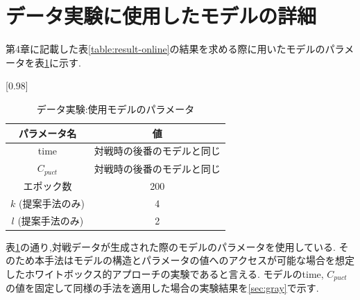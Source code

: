 \section{データ実験に使用したモデルの詳細}
第4章に記載した表\ref{table:result-online}の結果を求める際に用いたモデルのパラメータを表\ref{table:param-data}に示す.
\begin{table}[H]
	\caption{データ実験:使用モデルのパラメータ}
	\centering
	\scalebox{0.98}[0.98]{
		\begin{tabular}{c|c}
			パラメータ名 & 値 \\ \hline
			time    & 対戦時の後番のモデルと同じ \\ 
			$C_{puct}$    & 対戦時の後番のモデルと同じ \\
			エポック数 & 200 \\
			$k$ (提案手法のみ)     & 4 \\
			$l$ (提案手法のみ)     & 2 \\
		\end{tabular}
	}
	\label{table:param-data}
\end{table}

表\ref{table:param-data}の通り,対戦データが生成された際のモデルのパラメータを使用している.
そのため本手法はモデルの構造とパラメータの値へのアクセスが可能な場合を想定したホワイトボックス的アプローチの実験であると言える.
モデルのtime, $C_{puct}$の値を固定して同様の手法を適用した場合の実験結果を\ref{sec:gray}で示す.
